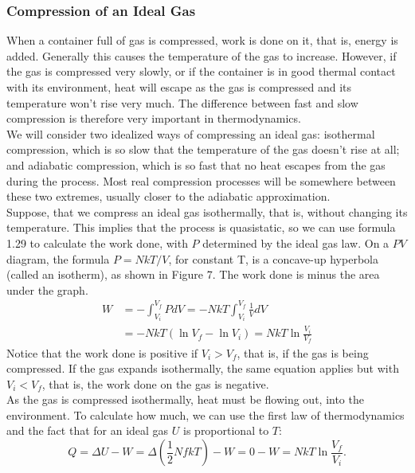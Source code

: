 \documentclass[11pt]{exam}
\begin{document}
\subsubsection*{Compression of an Ideal Gas}
When a container full of gas is compressed, work is done on it, that is, energy is added. Generally this causes the temperature of the gas to increase. However, if the gas is compressed very slowly, or if the container is in good thermal contact with its environment, heat will escape as the gas is compressed and its temperature won't rise very much. The difference between fast and slow compression is therefore very important in thermodynamics. \\
\hspace*{10mm}We will consider two idealized ways of compressing an ideal gas: isothermal compression, which is so slow that the temperature of the gas doesn't rise at all; and adiabatic compression, which is so fast that no heat escapes from the gas during the process. Most real compression processes will be somewhere between these two extremes, usually closer to the adiabatic approximation. \\
\hspace*{10mm}Suppose, that we compress an ideal gas isothermally, that is, without changing its temperature. This implies that the process is quasistatic, so we can use formula 1.29 to calculate the work done, with $P$ determined by the ideal gas law. On a $PV$ diagram, the formula $P=NkT/V$, for constant T, is a concave-up hyperbola (called an isotherm), as shown in Figure 7. The work done is minus the area under the graph. 
\begin{align*}\tag{1.30}
W &= -\int_{V_i}^{V_f}PdV=-NkT\int_{V_i}^{V_f}\frac{1}{V}dV\\
&=-NkT(\ln{V_f}-\ln{V_i})=NkT\ln{\frac{V_i}{V_f}}
\end{align*}    
Notice that the work done is positive if $V_i > V_f$, that is, if the gas is being compressed. If the gas expands isothermally, the same equation applies but with $V_i < V_f$, that is, the work done on the gas is negative.\\
\hspace*{10mm}As the gas is compressed isothermally, heat must be flowing out, into the environment. To calculate how much, we can use the first law of thermodynamics and the fact that for an ideal gas $U$ is proportional to $T$:
\begin{equation}\tag{1.31}
Q=\Delta U-W=\Delta(\frac{1}{2}NfkT)-W=0-W=NkT\ln{\frac{V_f}{V_i}}.
\end{equation}
\end{document}
